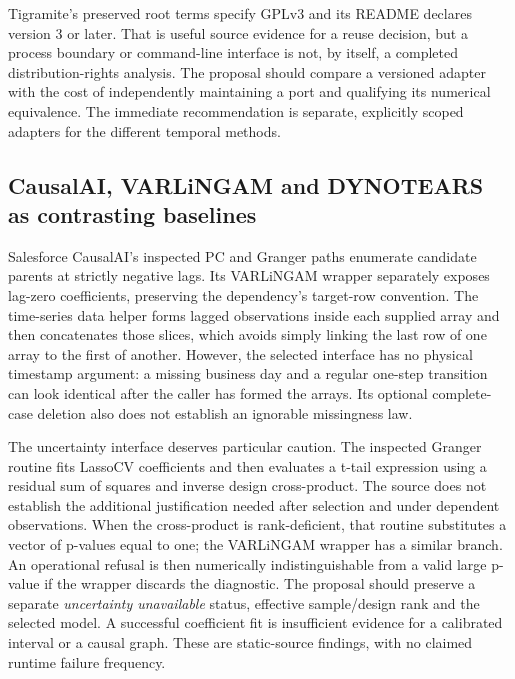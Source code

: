 Tigramite's preserved root terms specify GPLv3 and its README declares
version 3 or later. That is useful source evidence for a reuse decision,
but a process boundary or command-line interface is not, by itself, a
completed distribution-rights analysis. The proposal should compare a
versioned adapter with the cost of independently maintaining a port and
qualifying its numerical equivalence. The immediate recommendation is
separate, explicitly scoped adapters for the different temporal methods.
\citep{exec14_pt_tigramite,exec14_pt_contract}

\subsection{CausalAI, VARLiNGAM and DYNOTEARS as contrasting baselines}

Salesforce CausalAI's inspected PC and Granger paths enumerate candidate
parents at strictly negative lags. Its VARLiNGAM wrapper separately exposes
lag-zero coefficients, preserving the dependency's target-row convention.
The time-series data helper forms lagged observations inside each supplied
array and then concatenates those slices, which avoids simply linking the
last row of one array to the first of another. However, the selected
interface has no physical timestamp argument: a missing business day and
a regular one-step transition can look identical after the caller has
formed the arrays. Its optional complete-case deletion also does not
establish an ignorable missingness law. \citep{exec14_pt_causalai}

The uncertainty interface deserves particular caution. The inspected
Granger routine fits LassoCV coefficients and then evaluates a t-tail
expression using a residual sum of squares and inverse design cross-product.
The source does not establish the additional justification needed after
selection and under dependent observations. When the cross-product is
rank-deficient, that routine substitutes a vector of p-values equal to one;
the VARLiNGAM wrapper has a similar branch. An operational refusal is then
numerically indistinguishable from a valid large p-value if the wrapper
discards the diagnostic. The proposal should preserve a separate
\emph{uncertainty unavailable} status, effective sample/design rank and
the selected model. A successful coefficient fit is insufficient evidence
for a calibrated interval or a causal graph. These are static-source
findings, with no claimed runtime failure frequency.
\citep{exec14_pt_causalai}

